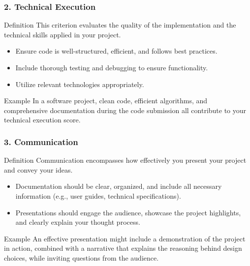 \documentclass[aspectratio=169]{beamer}
\begin{document}
\begin{frame}[fragile]
    \frametitle{2. Technical Execution}
    \begin{block}{Definition}
        This criterion evaluates the quality of the implementation and the technical skills applied in your project.
    \end{block}
    
    \begin{itemize}
        \item Ensure code is well-structured, efficient, and follows best practices.
        \item Include thorough testing and debugging to ensure functionality.
        \item Utilize relevant technologies appropriately.
    \end{itemize}
    
    \begin{block}{Example}
        In a software project, clean code, efficient algorithms, and comprehensive documentation during the code submission all contribute to your technical execution score.
    \end{block}
\end{frame}

\begin{frame}[fragile]
    \frametitle{3. Communication}
    \begin{block}{Definition}
        Communication encompasses how effectively you present your project and convey your ideas.
    \end{block}
    
    \begin{itemize}
        \item Documentation should be clear, organized, and include all necessary information (e.g., user guides, technical specifications).
        \item Presentations should engage the audience, showcase the project highlights, and clearly explain your thought process.
    \end{itemize}
    
    \begin{block}{Example}
        An effective presentation might include a demonstration of the project in action, combined with a narrative that explains the reasoning behind design choices, while inviting questions from the audience.
    \end{block}
\end{frame}
\end{document}
